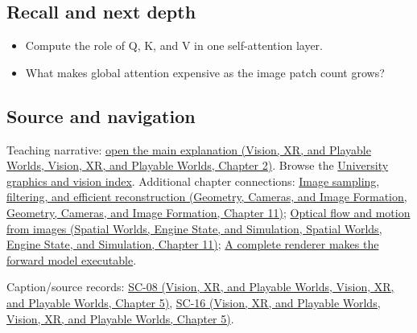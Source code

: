 \subsection{Recall and next depth}\label{appendix-a9d5dfdd164a-recall-and-next-depth}

\begin{itemize}
\tightlist
\item
  Compute the role of Q, K, and V in one self-attention layer.
\item
  What makes global attention expensive as the image patch count grows?
\end{itemize}

\subsection{Source and navigation}\label{appendix-a9d5dfdd164a-source-and-navigation}

Teaching narrative: \href{../07-Vision-XR-and-Playable-Worlds/main.pdf\#nameddest=04-visual-computing-ii-ch031-sequence-models-and-attention}{open the main explanation (Vision, XR, and Playable Worlds, Vision, XR, and Playable Worlds, Chapter 2)}. Browse the \hyperref[appendix-a6d556a4ef50-university-graphics-vision-and-photography---independent-series]{University graphics and vision index}. Additional chapter connections: \href{../03-Geometry-Cameras-and-Image-Formation/main.pdf\#nameddest=03-visual-computing-i-ch004-image-sampling-filtering-and-efficient-reconstruction}{Image sampling, filtering, and efficient reconstruction (Geometry, Cameras, and Image Formation, Geometry, Cameras, and Image Formation, Chapter 11)}; \href{../05-Spatial-Worlds-Engine-State-and-Simulation/main.pdf\#nameddest=04-visual-computing-ii-ch030-optical-flow-and-motion-from-images}{Optical flow and motion from images (Spatial Worlds, Engine State, and Simulation, Spatial Worlds, Engine State, and Simulation, Chapter 11)}; \hyperref[04-visual-computing-ii-ch035-a-complete-renderer-makes-the-forward-model-executable]{A complete renderer makes the forward model executable}.

Caption/source records: \href{../07-Vision-XR-and-Playable-Worlds/main.pdf\#nameddest=04-visual-computing-ii-ch036-sc-08---stanford-cs231n-spring-2025-lecture-8-attention-and-transformers}{SC-08 (Vision, XR, and Playable Worlds, Vision, XR, and Playable Worlds, Chapter 5)}, \href{../07-Vision-XR-and-Playable-Worlds/main.pdf\#nameddest=04-visual-computing-ii-ch036-sc-16---stanford-cs231n-deep-learning-for-computer-vision-spring-2025-lecture-16-vision-and-language}{SC-16 (Vision, XR, and Playable Worlds, Vision, XR, and Playable Worlds, Chapter 5)}.
